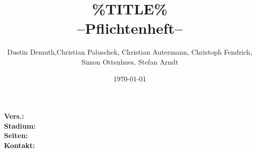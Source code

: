 \documentclass[a4paper,11pt]{article}             %
\begin{document}
\title{\%TITLE\% \\ \small --Pflichtenheft--}
\author{Dustin Demuth,Christian Paluschek, Christian Autermann, Christoph Fendrich, Simon Ottenhues, Stefan Arndt}
\date{\today}
\status{}
\maketitle
\thispagestyle{empty}

\begin{center}
\bf Vers.: \MyVersion \\
\bf Stadium: \MyStatus\\
\bf Seiten: \thelastpage \\
\bf Kontakt: \email \\
\end{center}
\newpage

\tableofcontents

\newpage
\end{document}
